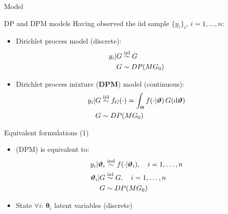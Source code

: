 
\begin{frame}[c] %
	\begin{center}
		\huge \color{blue} Model
	\end{center}
\end{frame}


\begin{frame}{DP and DPM models} %
	Having observed the iid sample $\{y_i\}_i$, $i=1,\dots,n$:
	\begin{itemize}
		\item Dirichlet process model (discrete):
		\begin{align*}
		y_i | G &\stackrel{\text{iid}}{\sim} G \\
		G &\sim DP(MG_0)
		\end{align*}
		\item Dirichlet process mixture (\textbf{DPM}) model (continuous):
		\begin{align*}
		y_i | G &\stackrel{\text{iid}}{\sim} f_G(\cdot) = \int_\Theta f(\cdot|\boldsymbol{\vartheta}) \, G(\mathrm d\boldsymbol{\vartheta}) \\
		G &\sim DP(M G_0)
		\end{align*}
	\end{itemize}
\end{frame}


\begin{frame}{Equivalent formulations (1)} %
	\begin{itemize}
		\item (DPM) is equivalent to:
		\begin{align*}
		y_i | \boldsymbol{\vartheta}_i &\stackrel{\text{ind}}{\sim} f(\cdot|\boldsymbol{\vartheta}_i), \quad i=1,\dots,n \\
		\boldsymbol{\vartheta}_i | G &\stackrel{\text{iid}}{\sim} G, \quad i=1,\dots,n \\ 
		G &\sim DP(M G_0)
		\end{align*}
		\item State $\forall i$: $\boldsymbol\theta_i$ latent variables (discrete)
	\end{itemize}
\end{frame}

